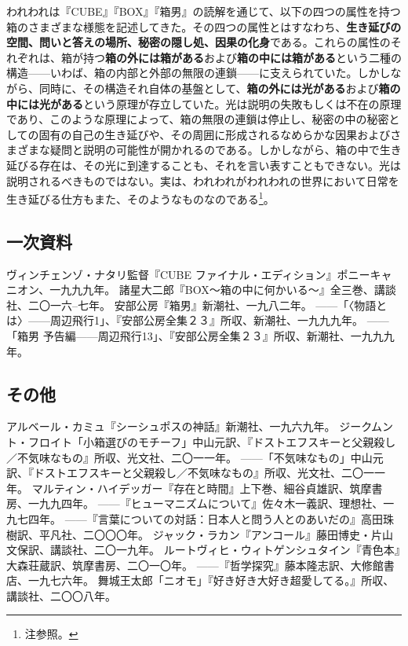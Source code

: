 \documentclass[9pt,b5j,twoside,twocolumn]{utarticle}
\begin{document}
われわれは『CUBE』『BOX』『箱男』の読解を通じて、以下の四つの属性を持つ箱のさまざまな様態を記述してきた。その四つの属性とはすなわち、\textbf{生き延びの空間、問いと答えの場所、秘密の隠し処、因果の化身}である。これらの属性のそれぞれは、箱が持つ\textbf{箱の外には箱がある}および\textbf{箱の中には箱がある}という二種の構造------いわば、箱の内部と外部の無限の連鎖------に支えられていた。しかしながら、同時に、その構造それ自体の基盤として、\textbf{箱の外には光がある}および\textbf{箱の中には光がある}という原理が存立していた。光は説明の失敗もしくは不在の原理であり、このような原理によって、箱の無限の連鎖は停止し、秘密の中の秘密としての固有の自己の生き延びや、その周囲に形成されるなめらかな因果およびさまざまな疑問と説明の可能性が開かれるのである。しかしながら、箱の中で生き延びる存在は、その光に到達することも、それを言い表すこともできない。光は説明されるべきものではない。実は、われわれがわれわれの世界において日常を生き延びる仕方もまた、そのようなものなのである\footnote{注参照。}。
\clearpage
\theendnotes
\begin{thebibliography}{99}
{\small
\subsection*{一次資料}
ヴィンチェンゾ・ナタリ監督『CUBE ファイナル・エディション』ポニーキャニオン、一九九九年。
諸星大二郎『BOX～箱の中に何かいる～』全三巻、講談社、二〇一六--七年。
安部公房『箱男』新潮社、一九八二年。
------「〈物語とは〉------周辺飛行1」、『安部公房全集２３』所収、新潮社、一九九九年。
------「箱男 予告編------周辺飛行13」、『安部公房全集２３』所収、新潮社、一九九九年。
\subsection*{その他}
アルベール・カミュ『シーシュポスの神話』新潮社、一九六九年。
ジークムント・フロイト「小箱選びのモチーフ」中山元訳、『ドストエフスキーと父親殺し／不気味なもの』所収、光文社、二〇一一年。
------「不気味なもの」中山元訳、『ドストエフスキーと父親殺し／不気味なもの』所収、光文社、二〇一一年。
マルティン・ハイデッガー『存在と時間』上下巻、細谷貞雄訳、筑摩書房、一九九四年。
------『ヒューマニズムについて』佐々木一義訳、理想社、一九七四年。
------『言葉についての対話：日本人と問う人とのあいだの』高田珠樹訳、平凡社、二〇〇〇年。
ジャック・ラカン『アンコール』藤田博史・片山文保訳、講談社、二〇一九年。
ルートヴィヒ・ウィトゲンシュタイン『青色本』大森荘蔵訳、筑摩書房、二〇一〇年。
------『哲学探究』藤本隆志訳、大修館書店、一九七六年。
舞城王太郎「ニオモ」『好き好き大好き超愛してる。』所収、講談社、二〇〇八年。
}
\end{thebibliography}
\end{document}
